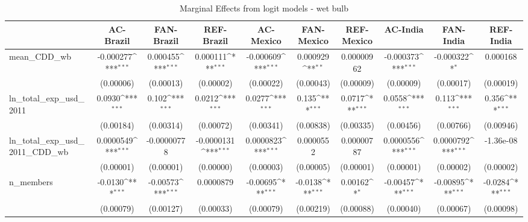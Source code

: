 \begin{table}[htbp]\centering
\def\sym#1{\ifmmode^{#1}\else\(^{#1}\)\fi}
\caption{Marginal Effects from logit models - wet bulb}
\begin{tabular}{l*{9}{c}}
\hline\hline
            &\multicolumn{1}{c}{AC-Brazil}&\multicolumn{1}{c}{FAN-Brazil}&\multicolumn{1}{c}{REF-Brazil}&\multicolumn{1}{c}{AC-Mexico}&\multicolumn{1}{c}{FAN-Mexico}&\multicolumn{1}{c}{REF-Mexico}&\multicolumn{1}{c}{AC-India}&\multicolumn{1}{c}{FAN-India}&\multicolumn{1}{c}{REF-India}\\
\hline
mean\_CDD\_wb &   -0.000277\sym{***}&    0.000455\sym{***}&    0.000111\sym{***}&   -0.000609\sym{***}&    0.000929\sym{**} &  0.00000962         &   -0.000373\sym{***}&   -0.000322\sym{*}  &    0.000168         \\
            &   (0.00006)         &   (0.00013)         &   (0.00002)         &   (0.00022)         &   (0.00043)         &   (0.00009)         &   (0.00009)         &   (0.00017)         &   (0.00019)         \\
ln\_total\_exp\_usd\_2011&      0.0930\sym{***}&       0.102\sym{***}&      0.0212\sym{***}&      0.0277\sym{***}&       0.135\sym{***}&      0.0717\sym{***}&      0.0558\sym{***}&       0.113\sym{***}&       0.356\sym{***}\\
            &   (0.00184)         &   (0.00314)         &   (0.00072)         &   (0.00341)         &   (0.00838)         &   (0.00335)         &   (0.00456)         &   (0.00766)         &   (0.00946)         \\
ln\_total\_exp\_usd\_2011\_CDD\_wb&   0.0000549\sym{***}& -0.00000778         &  -0.0000131\sym{***}&   0.0000823\sym{***}&   0.0000552         &  0.00000787         &   0.0000556\sym{***}&   0.0000792\sym{***}&   -1.36e-08         \\
            &   (0.00001)         &   (0.00001)         &   (0.00000)         &   (0.00003)         &   (0.00005)         &   (0.00001)         &   (0.00001)         &   (0.00002)         &   (0.00002)         \\
n\_members   &     -0.0130\sym{***}&    -0.00573\sym{***}&   0.0000879         &    -0.00695\sym{***}&     -0.0138\sym{***}&     0.00162\sym{*}  &    -0.00457\sym{***}&    -0.00895\sym{***}&     -0.0284\sym{***}\\
            &   (0.00079)         &   (0.00127)         &   (0.00033)         &   (0.00079)         &   (0.00219)         &   (0.00088)         &   (0.00040)         &   (0.00067)         &   (0.00098)         \\

\end{tabular}
\end{table}
